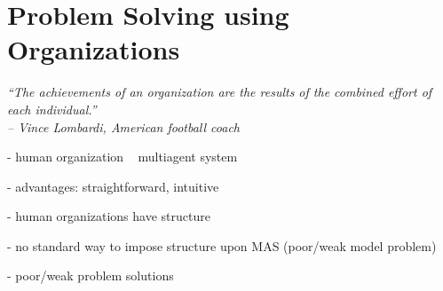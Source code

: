 
\chapter{Problem Solving using Organizations}

\begin{flushright}
\textit{``The achievements of an organization are the results of the combined effort of each individual.''}\\
\textit{-- Vince Lombardi, American football coach}
\end{flushright}

- human organization ~ multiagent system

- advantages: straightforward, intuitive

- human organizations have structure

- no standard way to impose structure upon MAS (poor/weak model problem)

- poor/weak problem solutions
